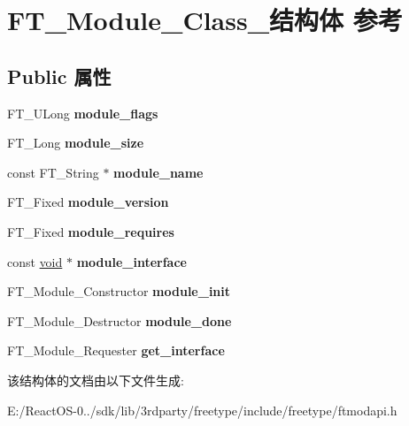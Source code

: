 \hypertarget{struct_f_t___module___class__}{}\section{F\+T\+\_\+\+Module\+\_\+\+Class\+\_\+结构体 参考}
\label{struct_f_t___module___class__}
\subsection*{Public 属性}
\begin{DoxyCompactItemize}
\item 
\mbox{\label{struct_f_t___module___class___a54a02a3767955cd8fa0cd786bd1f9515}} 
F\+T\+\_\+\+U\+Long {\bfseries module\+\_\+flags}
\item 
\mbox{\label{struct_f_t___module___class___a2582eeab364e4fbbd5d1e420bfcf3207}} 
F\+T\+\_\+\+Long {\bfseries module\+\_\+size}
\item 
\mbox{\label{struct_f_t___module___class___af25b9e32b6c91e0c31560efb62886ed7}} 
const F\+T\+\_\+\+String $\ast$ {\bfseries module\+\_\+name}
\item 
\mbox{\label{struct_f_t___module___class___a5b649f1965c42fd8c54bbc370fbf60b4}} 
F\+T\+\_\+\+Fixed {\bfseries module\+\_\+version}
\item 
\mbox{\label{struct_f_t___module___class___a24772981bd972d342f54a6e1704f85c3}} 
F\+T\+\_\+\+Fixed {\bfseries module\+\_\+requires}
\item 
\mbox{\label{struct_f_t___module___class___a320168f227e2d268691429ac0c6b2900}} 
const \hyperlink{interfacevoid}{void} $\ast$ {\bfseries module\+\_\+interface}
\item 
\mbox{\label{struct_f_t___module___class___a60f2bb9eee68366f20fe0613f347ffbd}} 
F\+T\+\_\+\+Module\+\_\+\+Constructor {\bfseries module\+\_\+init}
\item 
\mbox{\label{struct_f_t___module___class___ab6e9c780519e24a51144df79692cf339}} 
F\+T\+\_\+\+Module\+\_\+\+Destructor {\bfseries module\+\_\+done}
\item 
\mbox{\label{struct_f_t___module___class___aa72d79fcd0991231e24e88f359244e8e}} 
F\+T\+\_\+\+Module\+\_\+\+Requester {\bfseries get\+\_\+interface}
\end{DoxyCompactItemize}


该结构体的文档由以下文件生成\+:\begin{DoxyCompactItemize}
\item 
E\+:/\+React\+O\+S-\/0../sdk/lib/3rdparty/freetype/include/freetype/ftmodapi.\+h\end{DoxyCompactItemize}

